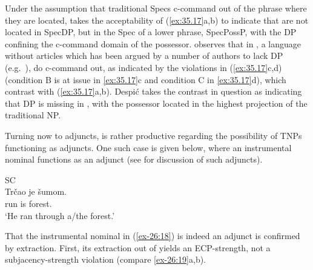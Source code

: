 \documentclass[output=paper]{langsci/langscibook}
\begin{document}
Under the assumption that traditional Specs c-command out of the phrase where
they are located, \citet{Kayne1994} takes the acceptability of (\ref{ex:35.17}a,b) to
indicate that   are not located in SpecDP, but in the Spec of
a lower phrase, SpecPossP, with the DP confining the c-command domain of the
possessor. \textcite{Despic2011,Despic2013} observes that in , a
language without articles which has been argued by a number of authors to lack
DP (e.g.\
\citealt{Corver1992,Zlatic1997,Trenkic2004,Boskovic2005,Boskovic2012,%
    Boskovic2014,Marelj2011,Despic2011,Despic2013,Runic2014a,Runic2014b,%
Takahashi2012,Talic2014,Talic2015}), \isi{possessors} do c-command out, as indicated
by the \isi{binding} violations in (\ref{ex:35.17}c,d) (condition B is at
issue in \ref{ex:35.17}c and condition C in \ref{ex:35.17}d), which contrast with 
(\ref{ex:35.17}a,b). Despić takes the contrast in question as indicating
that DP is missing in \glsentrytext{SC}, with the possessor located in the
highest projection of the traditional NP.

Turning now to adjuncts,  is rather productive
regarding the possibility of \glspl{TNP} functioning as
adjuncts. One such case is given below, where an instrumental
nominal functions as an adjunct (see \citealt{Boskovic2018} for discussion of
such adjuncts).

\ea\label{ex-26:18}\glsdesc{SC}\\
    \gll Trčao  je  šumom.\\
            run is forest.\Ins{}\\
	\glt    \enquote*{He ran through a/the forest.}
\z

That the instrumental nominal in (\ref{ex-26:18}) is indeed an adjunct is
confirmed by extraction. First, its extraction out of \isi{islands} yields an
\gls{ECP}-strength, not a sub\-ja\-cency-strength violation (compare
\ref{ex-26:19}a,b).

\ea\label{ex-26:19} \\
	\z
\z
\end{document}
